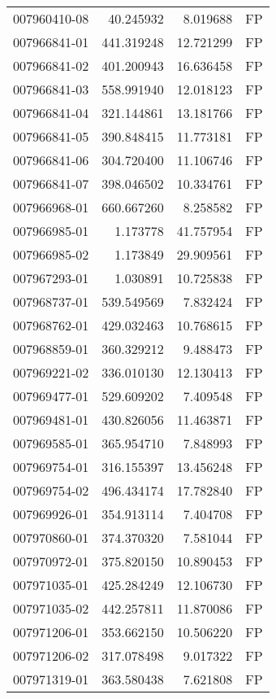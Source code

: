 \begin{tabular}{lrrl}
007960410-08 &   40.245932 &     8.019688 &   FP \\
007966841-01 &  441.319248 &    12.721299 &   FP \\
007966841-02 &  401.200943 &    16.636458 &   FP \\
007966841-03 &  558.991940 &    12.018123 &   FP \\
007966841-04 &  321.144861 &    13.181766 &   FP \\
007966841-05 &  390.848415 &    11.773181 &   FP \\
007966841-06 &  304.720400 &    11.106746 &   FP \\
007966841-07 &  398.046502 &    10.334761 &   FP \\
007966968-01 &  660.667260 &     8.258582 &   FP \\
007966985-01 &    1.173778 &    41.757954 &   FP \\
007966985-02 &    1.173849 &    29.909561 &   FP \\
007967293-01 &    1.030891 &    10.725838 &   FP \\
007968737-01 &  539.549569 &     7.832424 &   FP \\
007968762-01 &  429.032463 &    10.768615 &   FP \\
007968859-01 &  360.329212 &     9.488473 &   FP \\
007969221-02 &  336.010130 &    12.130413 &   FP \\
007969477-01 &  529.609202 &     7.409548 &   FP \\
007969481-01 &  430.826056 &    11.463871 &   FP \\
007969585-01 &  365.954710 &     7.848993 &   FP \\
007969754-01 &  316.155397 &    13.456248 &   FP \\
007969754-02 &  496.434174 &    17.782840 &   FP \\
007969926-01 &  354.913114 &     7.404708 &   FP \\
007970860-01 &  374.370320 &     7.581044 &   FP \\
007970972-01 &  375.820150 &    10.890453 &   FP \\
007971035-01 &  425.284249 &    12.106730 &   FP \\
007971035-02 &  442.257811 &    11.870086 &   FP \\
007971206-01 &  353.662150 &    10.506220 &   FP \\
007971206-02 &  317.078498 &     9.017322 &   FP \\
007971319-01 &  363.580438 &     7.621808 &   FP \\

\end{tabular}
